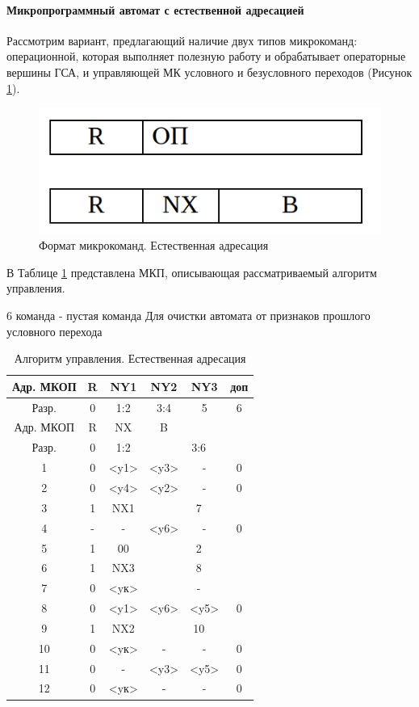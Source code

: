 \documentclass[a4paper,14pt]{extarticle}
\begin{document}
\newpage
\paragraph{Микропрограммный автомат с естественной адресацией}
Рассмотрим вариант, предлагающий наличие двух типов микрокоманд: операционной, которая выполняет полезную работу и обрабатывает операторные
вершины ГСА, и управляющей МК условного и безусловного переходов (Рисунок \ref{fig:mk-mix-nat}).

\begin{figure}[h!]
	\centering
	\includegraphics[width=0.4\linewidth]{images/mk-mix-nat}
	\caption{Формат микрокоманд. Естественная адресация}
	\label{fig:mk-mix-nat}
\end{figure}


В Таблице \ref{tab:manage-algorithm2} представлена МКП, описывающая рассматриваемый алгоритм управления. 

6 команда  - пустая команда
Для очистки автомата от признаков прошлого условного перехода

\begin{table}[htbp]
	\centering
	\begin{tabular}{|c|c|c|c|c|c|}
		\hline
		Адр. МКОП & R & NY1 & NY2 & NY3 & доп \\ \hline
		Разр. & 0 & 1:2 & 3:4 & 5 & 6 \\ \hline
		Адр. МКОП & R & NX & B &  &  \\ \hline
		Разр. & 0 & 1:2 & \multicolumn{ 3}{c|}{3:6} \\ \hline
		1 & 0 & <y1> & <y3> & - & 0 \\ \hline
		2 & 0 & <y4> & <y2> & - & 0 \\ \hline
		3 & 1 & NX1 &  \multicolumn{ 3}{c|}{7}  \\ \hline
		4 & - & - & {<y6>}& - & 0 \\ \hline
		5 & 1 & 00 &  \multicolumn{ 3}{c|}{2}  \\ \hline
		6 & 1 & NX3 & \multicolumn{ 3}{c|}{8}  \\ \hline
		7 & 0 & <yк> & \multicolumn{ 3}{c|}{-} \\ \hline
		8 & 0 & <y1> & <y6> & <y5> & 0 \\ \hline
		9 & 1 & NX2 &  \multicolumn{ 3}{c|}{10} \\ \hline
		10 & 0 & <yк> & -& -& 0 \\ \hline
		11 & 0 & - & <y3> & <y5> & 0 \\ \hline
		12 & 0 & <yк> & - & - & 0 \\ \hline
	\end{tabular}
	\caption{Алгоритм управления. Естественная адресация }
	\label{tab:manage-algorithm2}
\end{table}
\end{document}
